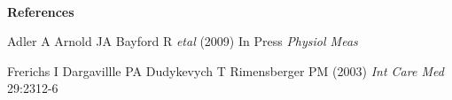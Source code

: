 \documentclass[12pt]{article}
\newcommand{\mysection}[1]{
~\\ \noindent
{\bf \normalsize #1}
\vspace{1mm}
}
\begin{document}
\vspace{-4mm}
\mysection{References}
\begin{thebibliography}{9}
\setlength{\itemsep}{-2mm}
\vspace{-1.8cm}
Adler A  Arnold JA Bayford R {\em etal} (2009)
In Press {\em Physiol Meas}

Frerichs I Dargavillle PA Dudykevych T Rimensberger PM (2003) 
{\em Int Care Med} 29:2312-6

\end{thebibliography}
\end{document}
